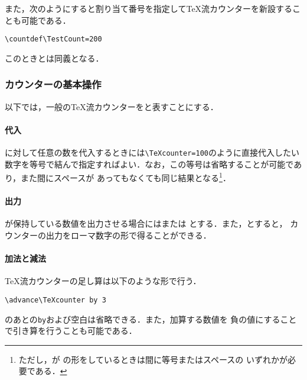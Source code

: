 \documentclass[autodetect-engine,dvipdfmx]{jsarticle}
\begin{document}
また，次のようにすると割り当て番号を指定して\TeX 流カウンターを新設することも可能である．
\texsource
\begin{lstlisting}
\countdef\TestCount=200
\end{lstlisting}
このときとは同義となる．

\subsubsection{カウンターの基本操作}

以下では，一般の\TeX 流カウンターをと表すことにする．

\paragraph{代入}
に対して任意の数を代入するときには\verb|\TeXcounter=100|のように直接代入したい
数字を等号で結んで指定すればよい．なお，この等号は省略することが可能であり，また間にスペースが
あってもなくても同じ結果となる\footnote{ただし，が
の形をしているときは間に等号またはスペースの
いずれかが必要である．}．

\newpage

\paragraph{出力}
が保持している数値を出力させる場合にはまたは
とする．また，とすると，
カウンターの出力をローマ数字の形で得ることができる．

\paragraph{加法と減法}
\TeX 流カウンターの足し算は以下のような形で行う．
\begin{lstlisting}
\advance\TeXcounter by 3
\end{lstlisting}
のあとの\texttt{by}および空白は省略できる．また，加算する数値を
負の値にすることで引き算を行うことも可能である．
%
%
\end{document}
